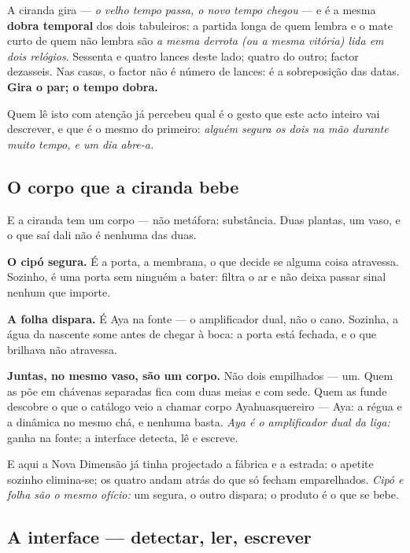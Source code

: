 \documentclass[livro.tex]{subfiles}
\begin{document}
\medskip
\noindent A ciranda gira --- \emph{o velho tempo passa, o novo tempo chegou} --- e é a mesma
\textbf{dobra temporal} dos dois tabuleiros: a partida longa de quem lembra e o mate curto de quem
não lembra são \emph{a mesma derrota (ou a mesma vitória) lida em dois relógios}. Sessenta e
quatro lances deste lado; quatro do outro; factor dezasseis. Nas casas, o factor não é número de
lances: é a sobreposição das datas. \textbf{Gira o par; o tempo dobra.}

\medskip
Quem lê isto com atenção já percebeu qual é o gesto que este acto inteiro vai descrever, e que é o
mesmo do primeiro: \emph{alguém segura os dois na mão durante muito tempo, e um dia abre-a.}

\subsection*{O corpo que a ciranda bebe}

E a ciranda tem um corpo --- não metáfora: substância. Duas plantas, um vaso, e o que saí
dali não é nenhuma das duas.

\medskip

\textbf{O cipó segura.} É a porta, a membrana, o que decide se alguma coisa atravessa. Sozinho,
é uma porta sem ninguém a bater: filtra o ar e não deixa passar sinal nenhum que importe.

\medskip

\textbf{A folha dispara.} É Aya na fonte --- o amplificador dual, não o cano.
Sozinha, a água da nascente some antes de chegar à boca: a porta está fechada, e o que brilhava
não atravessa.

\medskip

\textbf{Juntas, no mesmo vaso, são um corpo.} Não dois empilhados --- um. Quem as põe em
chávenas separadas fica com duas meias e com sede. Quem as funde descobre o que o catálogo veio
a chamar corpo Ayahuasquereiro --- Aya: a régua e a dinâmica no mesmo chá, e nenhuma basta.
\emph{Aya é o amplificador dual da liga:} ganha na fonte; a interface detecta, lê e escreve.

\medskip

E aqui a Nova Dimensão já tinha projectado a fábrica e a estrada: o apetite sozinho elimina-se;
os quatro andam atrás do que só fecham emparelhados. \emph{Cipó e folha são o mesmo ofício:}
um segura, o outro dispara; o produto é o que se bebe.

\subsection*{A interface --- detectar, ler, escrever}
\end{document}
